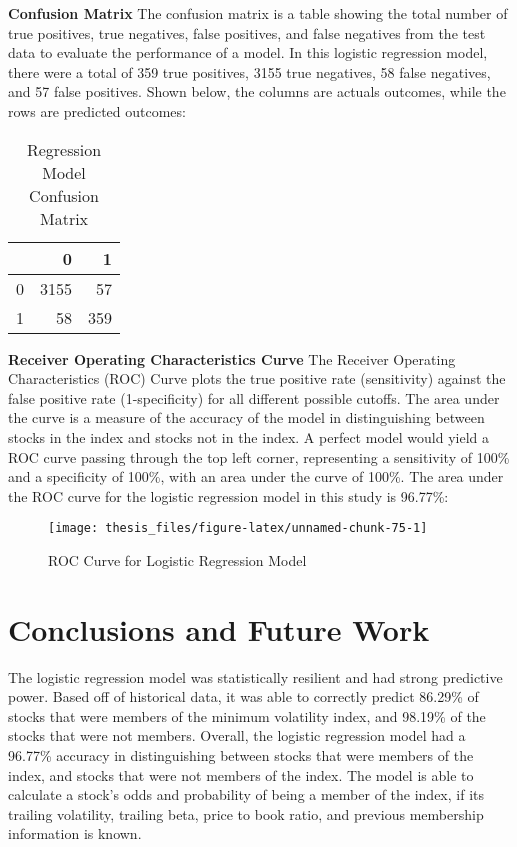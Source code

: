 \documentclass[12pt,twoside]{reedthesis}
\theoremstyle{definition}
\theoremstyle{definition}
\theoremstyle{definition}
\theoremstyle{remark}
\begin{document}
\hfill\break
\textbf{Confusion Matrix} \hfill\break
The confusion matrix is a table showing the total number of true
positives, true negatives, false positives, and false negatives from the
test data to evaluate the performance of a model. In this logistic
regression model, there were a total of 359 true positives, 3155 true
negatives, 58 false negatives, and 57 false positives. Shown below, the
columns are actuals outcomes, while the rows are predicted outcomes:
\begin{longtable}[t]{lrr}
\caption{\label{tab:unnamed-chunk-74}Regression Model Confusion Matrix}\\
\toprule
  & 0 & 1\\
\midrule
0 & 3155 & 57\\
1 & 58 & 359\\
\bottomrule
\end{longtable}
\hfill\break
\textbf{Receiver Operating Characteristics Curve} \hfill\break
The Receiver Operating Characteristics (ROC) Curve plots the true
positive rate (sensitivity) against the false positive rate
(1-specificity) for all different possible cutoffs. The area under the
curve is a measure of the accuracy of the model in distinguishing
between stocks in the index and stocks not in the index. A perfect model
would yield a ROC curve passing through the top left corner,
representing a sensitivity of 100\% and a specificity of 100\%, with an
area under the curve of 100\%. The area under the ROC curve for the
logistic regression model in this study is 96.77\%: \hfill\break
\begin{figure}

{\centering \texttt{[image: thesis\_files/figure-latex/unnamed-chunk-75-1]} 

}

\caption{ROC Curve for Logistic Regression Model}\label{fig:unnamed-chunk-75}
\end{figure}
\hfill\break

\chapter{Conclusions and Future Work}\label{conclusions-and-future-work}

The logistic regression model was statistically resilient and had strong
predictive power. Based off of historical data, it was able to correctly
predict 86.29\% of stocks that were members of the minimum volatility
index, and 98.19\% of the stocks that were not members. Overall, the
logistic regression model had a 96.77\% accuracy in distinguishing
between stocks that were members of the index, and stocks that were not
members of the index. The model is able to calculate a stock's odds and
probability of being a member of the index, if its trailing volatility,
trailing beta, price to book ratio, and previous membership information
is known.
\end{document}
